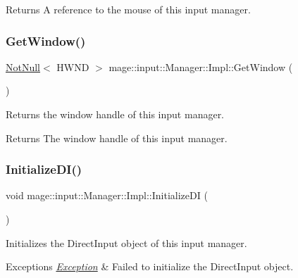 \begin{DoxyReturn}{Returns}
A reference to the mouse of this input manager. 
\end{DoxyReturn}
\mbox{\label{classmage_1_1input_1_1_manager_1_1_impl_a79b6d5d2d8290f3b3a40a7ee522de2bf}} 
\subsubsection{\texorpdfstring{Get\+Window()}{GetWindow()}}
{\footnotesize\ttfamily \mbox{\hyperlink{namespacemage_a8769f9d670d6b585ea306cb1062af94b}{Not\+Null}}$<$ H\+W\+ND $>$ mage\+::input\+::\+Manager\+::\+Impl\+::\+Get\+Window (\begin{DoxyParamCaption}{ }\end{DoxyParamCaption})\hspace{0.3cm}{\ttfamily [noexcept]}}

Returns the window handle of this input manager.

\begin{DoxyReturn}{Returns}
The window handle of this input manager. 
\end{DoxyReturn}
\mbox{\label{classmage_1_1input_1_1_manager_1_1_impl_a407de000dcb4df8fa32a09e246150daf}} 
\subsubsection{\texorpdfstring{Initialize\+D\+I()}{InitializeDI()}}
{\footnotesize\ttfamily void mage\+::input\+::\+Manager\+::\+Impl\+::\+Initialize\+DI (\begin{DoxyParamCaption}{ }\end{DoxyParamCaption})\hspace{0.3cm}{\ttfamily [private]}}

Initializes the Direct\+Input object of this input manager.


\begin{DoxyExceptions}{Exceptions}
{\em \mbox{\hyperlink{classmage_1_1_exception}{Exception}}} & Failed to initialize the Direct\+Input object. \\
\hline
\end{DoxyExceptions}
\mbox{\label{classmage_1_1input_1_1_manager_1_1_impl_af97f784f50a39c43ed41abe207a8f61e}} 
